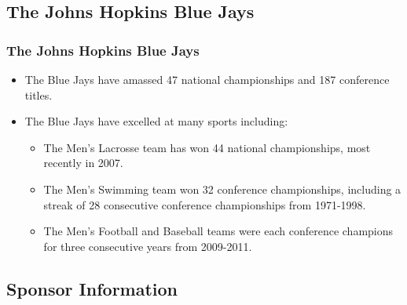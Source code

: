 \documentclass[compress,handout,10pt]{beamer}
\let\olditem\item
\renewcommand{\item}{\setlength{\itemsep}{0.5\baselineskip}\olditem}
\begin{document}
\subsection{The Johns Hopkins Blue Jays}

\begin{frame}
	\frametitle{The Johns Hopkins Blue Jays}
		\begin{itemize}
			\item The Blue Jays have amassed 47 national championships and 187 conference titles.\cite{hopathletic}
			\item The Blue Jays have excelled at many sports including:
			\begin{itemize}
				\item The Men's Lacrosse team has won 44 national championships, most recently in 2007.\cite{hopathletic}
				\item The Men's Swimming team won 32 conference championships, including a streak of 28 consecutive conference championships from 1971-1998.\cite{hopathletic}
				\item The Men's Football and Baseball teams were each conference champions for three consecutive years from 2009-2011. \cite{hopathletic}
		\end{itemize}
	\end{itemize}
\end{frame}

\subsection{Sponsor Information}
\end{document}
